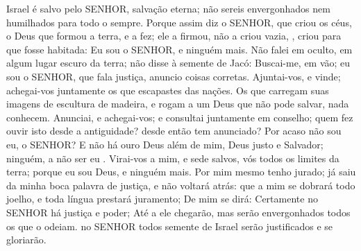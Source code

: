 {   Israel é salvo pelo SENHOR,
{} salvação eterna; não sereis envergonhados nem humilhados para todo o sempre.
  Porque assim diz o SENHOR, que criou os céus, o Deus que formou a terra, e a fez; ele a firmou, não a criou
{} vazia,
{}, criou para que fosse habitada: Eu sou o SENHOR, e ninguém mais.
  Não falei em oculto,
{} em algum lugar escuro da terra; não disse à semente de Jacó: Buscai-me, em vão; eu sou o SENHOR, que fala justiça,
{} anuncio coisas corretas.
  Ajuntai-vos, e vinde; achegai-vos juntamente os que escapastes das nações. Os que carregam suas imagens de escultura de madeira, e rogam a um Deus que não pode salvar, nada conhecem.
  Anunciai, e achegai-vos; e consultai juntamente em conselho; quem fez ouvir isto desde a antiguidade?
{} desde então tem anunciado? Por acaso não sou eu, o SENHOR? E não há ouro Deus além de mim, Deus justo e Salvador; ninguém, a não ser eu
{} .
  Virai-vos a mim, e sede salvos, vós todos os limites da terra; porque eu sou Deus, e ninguém mais.
  Por mim mesmo tenho jurado; já saiu da minha boca palavra de justiça, e não voltará atrás: que a mim se dobrará todo joelho, e toda língua prestará juramento;
  De mim se dirá: Certamente no SENHOR há justiça e poder; Até a ele chegarão, mas serão envergonhados todos os que o odeiam.
   no SENHOR todos
{} semente de Israel serão justificados e se gloriarão.
\par }

